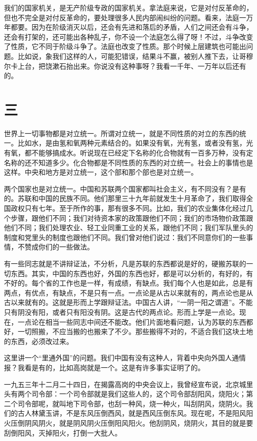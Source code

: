 我们的国家机关，是无产阶级专政的国家机关。拿法庭来说，它是对付反革命的，但也不完全是对付反革命的，要处理很多人民内部闹纠纷的问题。看来，法庭一万年都要。因为在阶级消灭以后，还会有先进和落后的矛盾，人们之间还会有斗争，还会有打架的，还可能出各种乱子，你不设一个法庭怎么得了呀！不过，斗争改变了性质，它不同于阶级斗争了。法庭也改变了性质。那个时候上层建筑也可能出问题。比如说，象我们这样的人，可能犯错误，结果斗不赢，被别人推下去，让哥穆尔卡上台，把饶漱石抬出来。你说没有这种事呀？我看一千年、一万年以后还有的。

\section*{三}

世界上一切事物都是对立统一。所谓对立统一，就是不同性质的对立的东西的统一。比如水，是由氢和氧两种元素结合的。如果没有氧，光有氢，或者没有氢，光有氧，都不能够搞成水。听说现在已经定下名称的化合物就有一百多万种，没有定名称的还不知道多少。化合物都是不同性质的东西的对立统一。社会上的事情也是这样。中央和地方是对立统一，这个部和那个部也是对立统一。

两个国家也是对立统一。中国和苏联两个国家都叫社会主义，有不同没有？是有的。苏联和中国的民族不同。他们那里三十九年前就发生十月革命了，我们取得全国政权只有七年。至于所作的事，那有很多不同。比如，我们的农业集体化经过几个步骤，跟他们不同；我们对待资本家的政策跟他们不同；我们的市场物价政策跟他们不同；我们处理农业、轻工业同重工业的关系，跟他们不同；我们军队里头的制度和党里头的制度也跟他们不同。我们曾对他们说过：我们不同意你们的一些事情，不赞成你们的一些做法。

有一些同志就是不讲辩证法，不分析，凡是苏联的东西都说是好的，硬搬苏联的一切东西。其实，中国的东西也好，外国的东西也好，都是可以分析的，有好的，有不好的。每个省的工作也是一样，有成绩，有缺点。我们每个人也是如此，总是有两点，有优点，有缺点，不是只有一点。一点论是从古以来就有的，两点论也是从古以来就有的。这就是形而上学跟辩证法。中国古人讲，“一阴一阳之谓道”。不能只有阴没有阳，或者只有阳没有阴。这是古代的两点论。形而上学是一点论。现在，一点论在相当一些同志中间还不能改。他们片面地看问题，认为苏联的东西都好，一切照搬，不应当搬的也搬来了不少。那些搬得不对的，不适合我们这块土地的东西，必须改过来。

这里讲一个“里通外国”的问题。我们中国有没有这种人，背着中央向外国人通情报？我看是有的，比如高岗就是一个。这是有许多事实证明了的。

一九五三年十二月二十四日，在揭露高岗的中央会议上，我曾经宣布说，北京城里头有两个司令部：一个司令部就是我们这些人的，这个司令部刮阳风，烧阳火；第二个司令部呢，就叫地下司令部，也刮一种风，烧一种火，叫刮阴风，烧阴火。我们的古人林黛玉讲，不是东风压倒西风，就是西风压倒东风。现在呢，不是阳风阳火压倒阴风阴火，就是阴风阴火压倒阳风阳火。他刮阴风，烧阴火，其目的就是要刮倒阳风，灭掉阳火，打倒一大批人。

